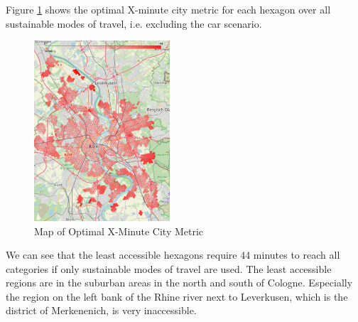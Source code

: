 Figure \ref{fig:optimal_map} shows the optimal X-minute city metric for each hexagon over all sustainable modes of travel, i.e. excluding the car scenario.
\begin{figure}
  \begin{center}
    \includegraphics[width=0.45\textwidth]{Figures/results/minute_city_metric/optimal_map}
  \end{center}
  \caption{Map of Optimal X-Minute City Metric}
  \label{fig:optimal_map}
\end{figure}
We can see that the least accessible hexagons require 44 minutes to reach all categories if only sustainable modes of travel are used.
The least accessible regions are in the suburban areas in the north and south of Cologne. 
Especially the region on the left bank of the Rhine river next to Leverkusen, which is the district of Merkenenich, is very inaccessible.

